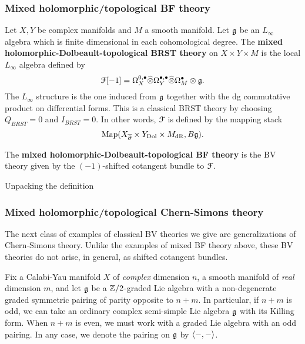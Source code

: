 \documentclass[10pt, oneside]{article}
\begin{document}
\subsubsection{Mixed holomorphic/topological BF theory}

\begin{dfn}
Let $X,Y$ be complex manifolds and $M$ a smooth manifold.
Let $\mathfrak g$ be an $L_\infty$ algebra which is finite dimensional in each cohomological degree. 
The {\bf mixed holomorphic-Dolbeault-topological BRST theory}   on $X \times Y \times M$ is the local $L_\infty$ algebra defined by
\[
\mathcal F[-1] = \Omega^{0,\bullet}_X \widehat{\otimes} \Omega^{\bullet,\bullet}_Y \widehat{\otimes} \Omega^\bullet_M \otimes \mathfrak g .
\] 
The $L_\infty$ structure is the one induced from $\mathfrak g$ together with the dg commutative product on differential forms. 
This is a classical BRST theory by choosing $Q_{BRST} = 0$ and $I_{BRST} = 0$. 
In other words, $\mathcal F$ is defined by the mapping stack
\[
{\rm Map} (X_{\overline{\partial}} \times Y_{\rm Dol} \times M_{\rm dR}, B \mathfrak g) .
\]

The {\bf mixed holomorphic-Dolbeault-topological BF theory} is the BV theory given by the $(-1)$-shifted cotangent bundle to $\mathcal F$.
\end{dfn}

Unpacking the definition  

\subsubsection{Mixed holomorphic/topological Chern-Simons theory}

The next class of examples of classical BV theories we give are generalizations of Chern-Simons theory. 
Unlike the examples of mixed BF theory above, these BV theories do not arise, in general, as shifted cotangent bundles. 

Fix a Calabi-Yau manifold $X$ of {\em complex} dimension $n$, a smooth manifold of {\em real} dimension $m$, and let $\mathfrak g$ be a $\mathbb Z/2$-graded Lie algebra with a non-degenerate graded symmetric pairing of parity opposite to $n+m$. 
In particular, if $n+m$ is odd, we can take an ordinary complex semi-simple Lie algebra $\mathfrak g$ with its Killing form. 
When $n+m$ is even, we must work with a graded Lie algebra with an odd pairing.
In any case, we denote the pairing on $\mathfrak g$ by $\langle-,-\rangle$. 
\end{document}
